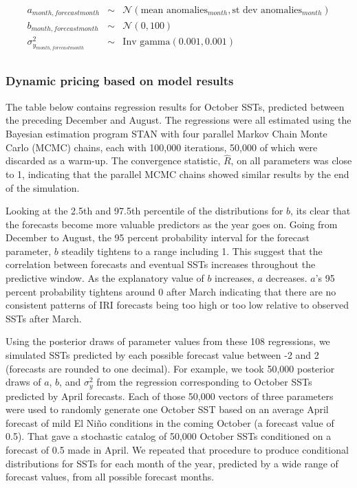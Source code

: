 \documentclass[authoryear]{article}
\begin{document}
\begin{equation}
\begin{array}{lcl}
a_{month,forecast month}  & \sim & \mathcal{N}(\mbox{mean anomalies}_{month}, \mbox{st dev anomalies}_{month}) \\
b_{month,forecast month}  & \sim & \mathcal{N}(0, 100) \\
\sigma_{y_{month,forecast month}}^2 & \sim  &\mbox{Inv gamma}(0.001, 0.001) \\
\end{array}
\label{eqn:priorsconditionalEstEqn}
\end{equation}

\subsubsection{Dynamic pricing based on model results}
The table below contains regression results for October SSTs, predicted between the preceding December and August. The regressions were all estimated using the Bayesian estimation program STAN with four parallel Markov Chain Monte Carlo (MCMC) chains, each with 100,000 iterations, 50,000 of which were discarded as a warm-up\cite{stan2013}. The convergence statistic, $\hat{R}$, on all parameters was close to 1, indicating that the parallel MCMC chains showed similar results by the end of the simulation.



Looking at the 2.5th and 97.5th percentile of the distributions for $b$, its clear that the forecasts become more valuable predictors as the year goes on. Going from December to August, the 95 percent probability interval for the forecast parameter, $b$ steadily tightens to a range including 1. This suggest that the correlation between forecasts and eventual SSTs increases throughout the predictive window. As the explanatory value of $b$ increases, $a$ decreases. $a$'s 95 percent probability tightens around 0 after March indicating that there are no consistent patterns of IRI forecasts being too high or too low relative to observed SSTs after March.

Using the posterior draws of parameter values from these 108 regressions, we simulated SSTs predicted by each possible forecast value between -2 and 2 (forecasts are rounded to one decimal). For example, we took 50,000 posterior draws of $a$, $b$, and $\sigma_{y}^2$ from the regression corresponding to October SSTs predicted by April forecasts. Each of those 50,000 vectors of three parameters were used to randomly generate one October SST based on an average April forecast of mild El Ni\~no conditions in the coming October (a forecast value of 0.5). That gave a stochastic catalog of 50,000 October SSTs conditioned on a forecast of 0.5 made in April. We repeated that procedure to produce conditional distributions for SSTs for each month of the year, predicted by a wide range of forecast values, from all possible forecast months. 
\end{document}
